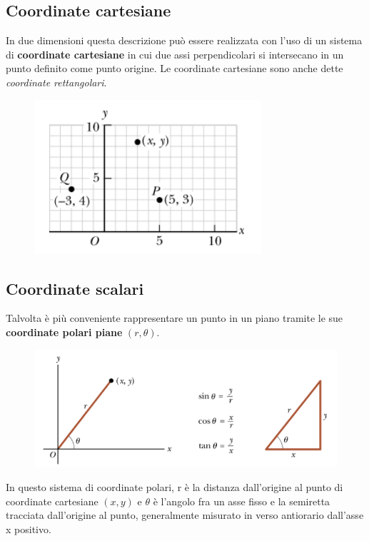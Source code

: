 \documentclass[a4paper,11pt,oneside]{book}
\begin{document}
\subsection{Coordinate cartesiane}
In due dimensioni questa descrizione può essere realizzata con l’uso di un sistema di \textbf{coordinate cartesiane}
in cui due assi perpendicolari si intersecano in un punto definito come punto origine.
Le coordinate cartesiane sono anche dette \emph{coordinate rettangolari}.
\begin{figure}[h]
    \includegraphics[scale=0.5]{coordinate_cartesiane}
    \centering
\end{figure}

\subsection{Coordinate scalari}
Talvolta è più conveniente rappresentare un punto in un piano tramite le sue \textbf{coordinate polari piane} $(r, \theta)$.

\begin{figure}[h]
    \includegraphics[scale=0.5]{coordinate_polari}
    \centering
\end{figure}
In questo sistema di coordinate polari, r è la distanza dall’origine al punto di coordinate
cartesiane $(x, y)$ e $\theta$ è l’angolo fra un asse fisso e la semiretta tracciata dall’origine al punto, generalmente
misurato in verso antiorario dall’asse x positivo.
\end{document}
